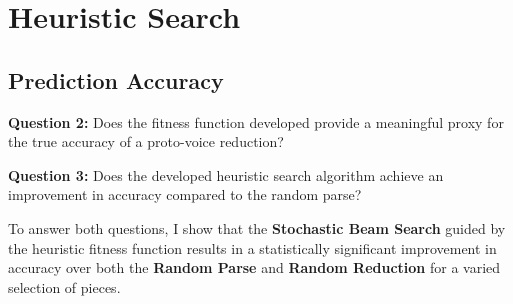 \documentclass[12pt,a4paper,twoside,openany]{report} \usepackage[pdfborder={0 0 0}]{hyperref}    %
\theoremstyle{definition} \newtheorem{definition}{Definition}[section]
\begin{document}
  \section{Heuristic Search} 
  \label{sec:evalBaseline}

  \subsection{Prediction Accuracy}
  \label{sub:evalExtAcc}
  \textbf{Question 2:} Does the fitness function developed provide a meaningful proxy for the true accuracy of
  a proto-voice reduction?

  \textbf{Question 3:} Does the developed heuristic search algorithm achieve an improvement in accuracy compared to the random parse?

  To answer both questions, I show that the \textbf{Stochastic Beam Search} guided by the heuristic fitness function
  results in a statistically significant improvement in accuracy over both the \textbf{Random Parse} and
  \textbf{Random Reduction} for a varied selection of pieces.

\end{document}
